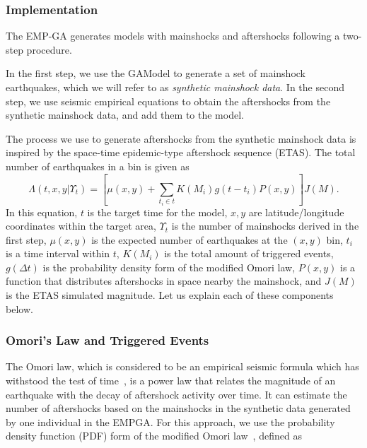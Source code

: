 \subsubsection*{Implementation}

The EMP-GA generates models with mainshocks and aftershocks following
a two-step procedure.

In the first step, we use the GAModel to generate a set of mainshock
earthquakes, which we will refer to as \emph{synthetic mainshock
  data}. In the second step, we use seismic empirical equations to
obtain the aftershocks from the synthetic mainshock data, and add them
to the model.

The process we use to generate aftershocks from the synthetic
mainshock data is inspired by the space-time epidemic-type aftershock
sequence (ETAS). The total number of earthquakes in a bin is given as
\begin{equation}\label{emp-model}
 \Lambda(t,x,y|\Upsilon_t) = [\mu(x,y) + \displaystyle\sum_{t_i \in t}
   K(M_i)g(t-t_i)P(x,y)]J(M).
\end{equation}
In this equation, $t$ is the target time for the model, $x,y$ are
latitude/longitude coordinates within the target area, $\Upsilon_t$ is
the number of mainshocks derived in the first step, $\mu(x,y)$ is the
expected number of earthquakes at the $(x,y)$ bin, $t_i$ is a time
interval within $t$, $K(M_i)$ is the total amount of triggered events,
$g(\Delta t)$ is the probability density form of the modified Omori
law, $P(x,y)$ is a function that distributes aftershocks in space
nearby the mainshock, and $J(M)$ is the ETAS simulated magnitude. Let
us explain each of these components below.

\subsubsection*{Omori's Law and Triggered Events}

The Omori law, which is considered to be an empirical seismic formula
which has withstood the test of
time~\cite{utsu1995centenary,omori1895after}, is a power law that
relates the magnitude of an earthquake with the decay of aftershock
activity over time. It can estimate the number of aftershocks based on
the mainshocks in the synthetic data generated by one individual in
the EMPGA. For this approach, we use the probability density function
(PDF) form of the modified Omori law~\cite{zhuang2004analyzing},
defined as


